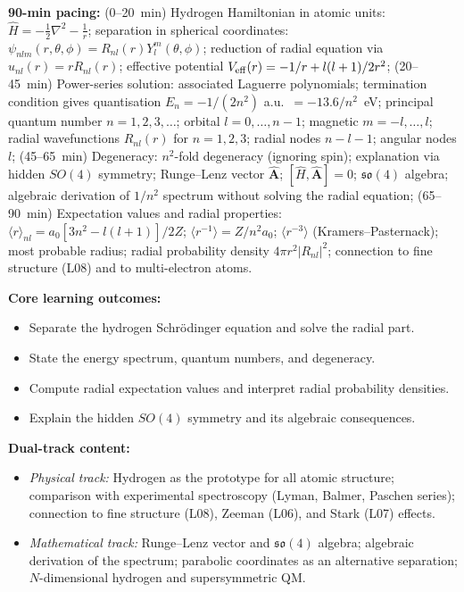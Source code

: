 \documentclass[11pt,a4paper]{article}
\begin{document}
\begin{tcolorbox}[modulebox, title={Module~I.4 / L09: The Hydrogen Atom}]
\textbf{90-min pacing:} (0--20~min) Hydrogen Hamiltonian in atomic units:
$\hat{H}=-\tfrac{1}{2}\nabla^2-\tfrac{1}{r}$;
separation in spherical coordinates: $\psi_{nlm}(r,\theta,\phi)=R_{nl}(r)Y_l^m(\theta,\phi)$;
reduction of radial equation via $u_{nl}(r)=rR_{nl}(r)$;
effective potential $V_{\rm eff}(r)=-1/r+l(l+1)/2r^2$;
(20--45~min) Power-series solution: associated Laguerre polynomials;
termination condition gives quantisation $E_n=-1/(2n^2)$ a.u.\ $= -13.6/n^2$~eV;
principal quantum number $n=1,2,3,\ldots$; orbital $l=0,\ldots,n-1$; magnetic $m=-l,\ldots,l$;
radial wavefunctions $R_{nl}(r)$ for $n=1,2,3$; radial nodes $n-l-1$; angular nodes $l$;
(45--65~min) Degeneracy: $n^2$-fold degeneracy (ignoring spin); explanation via hidden $SO(4)$ symmetry;
Runge--Lenz vector $\hat{\mathbf{A}}$; $[\hat{H},\hat{\mathbf{A}}]=0$; $\mathfrak{so}(4)$ algebra;
algebraic derivation of $1/n^2$ spectrum without solving the radial equation;
(65--90~min) Expectation values and radial properties: $\langle r\rangle_{nl}=a_0[3n^2-l(l+1)]/2Z$;
$\langle r^{-1}\rangle=Z/n^2a_0$; $\langle r^{-3}\rangle$ (Kramers--Pasternack);
most probable radius; radial probability density $4\pi r^2|R_{nl}|^2$;
connection to fine structure (L08) and to multi-electron atoms.

\medskip\textbf{Core learning outcomes:}
\begin{itemize}[leftmargin=1.4em,topsep=2pt,itemsep=1pt]
  \item Separate the hydrogen Schr\"odinger equation and solve the radial part.
  \item State the energy spectrum, quantum numbers, and degeneracy.
  \item Compute radial expectation values and interpret radial probability densities.
  \item Explain the hidden $SO(4)$ symmetry and its algebraic consequences.
\end{itemize}

\medskip\textbf{Dual-track content:}
\begin{itemize}[leftmargin=1.4em,topsep=2pt,itemsep=1pt]
  \item \textit{Physical track:} Hydrogen as the prototype for all atomic structure;
    comparison with experimental spectroscopy (Lyman, Balmer, Paschen series);
    connection to fine structure (L08), Zeeman (L06), and Stark (L07) effects.
  \item \textit{Mathematical track:} Runge--Lenz vector and $\mathfrak{so}(4)$ algebra;
    algebraic derivation of the spectrum; parabolic coordinates as an alternative separation;
    $N$-dimensional hydrogen and supersymmetric QM.
\end{itemize}


\end{tcolorbox}
\end{document}
